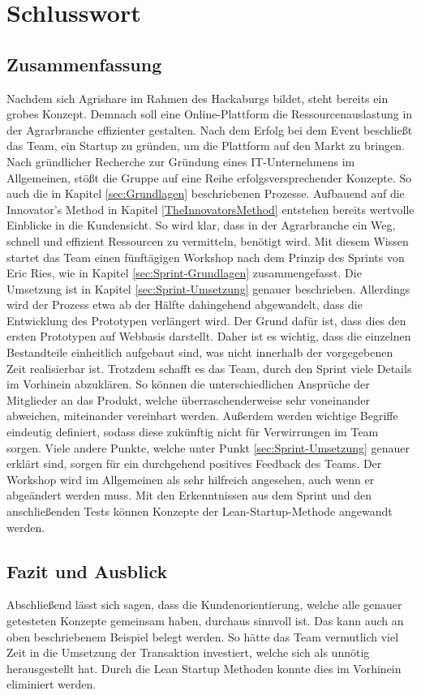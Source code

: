 \chapter{Schlusswort}
\section{Zusammenfassung}
Nachdem sich Agrishare im Rahmen des Hackaburgs bildet, steht bereits ein grobes Konzept. Demnach soll eine Online-Plattform die Ressourcenauslastung in der Agrarbranche effizienter gestalten. Nach dem Erfolg bei dem Event beschließt das Team, ein Startup zu gründen, um die Plattform auf den Markt zu bringen. Nach gründlicher Recherche zur Gründung eines IT-Unternehmens im Allgemeinen, stößt die Gruppe auf eine Reihe erfolgsversprechender Konzepte. So auch die in Kapitel \ref{sec:Grundlagen} beschriebenen Prozesse. Aufbauend auf die Innovator's Method in Kapitel \ref{TheInnovatorsMethod} entstehen bereits wertvolle Einblicke in die Kundensicht. So wird klar, dass in der Agrarbranche ein Weg, schnell und effizient Ressourcen zu vermitteln, benötigt wird. Mit diesem Wissen startet das Team einen fünftägigen Workshop nach dem Prinzip des Sprints von Eric Ries, wie in Kapitel \ref{sec:Sprint-Grundlagen} zusammengefasst. Die Umsetzung ist in Kapitel \ref{sec:Sprint-Umsetzung} genauer beschrieben. Allerdings wird der Prozess etwa ab der Hälfte dahingehend abgewandelt, dass die Entwicklung des Prototypen verlängert wird. Der Grund dafür ist, dass dies den ersten Prototypen auf Webbasis darstellt. Daher ist es wichtig, dass die einzelnen Bestandteile einheitlich aufgebaut sind, was nicht innerhalb der vorgegebenen Zeit realisierbar ist. Trotzdem schafft es das Team, durch den Sprint viele Details im Vorhinein abzuklären. So können die unterschiedlichen Ansprüche der Mitglieder an das Produkt, welche überraschenderweise sehr voneinander abweichen, miteinander vereinbart werden. Außerdem werden wichtige Begriffe eindeutig definiert, sodass diese zukünftig nicht für Verwirrungen im Team sorgen. Viele andere Punkte, welche unter Punkt \ref{sec:Sprint-Umsetzung} genauer erklärt sind, sorgen für ein durchgehend positives Feedback des Teams. Der Workshop wird im Allgemeinen als sehr hilfreich angesehen, auch wenn er abgeändert werden muss. Mit den Erkenntnissen aus dem Sprint und den anschließenden Tests können Konzepte der Lean-Startup-Methode angewandt werden.

\section{Fazit und Ausblick}
Abschließend lässt sich sagen, dass die Kundenorientierung, welche alle genauer getesteten Konzepte gemeinsam haben, durchaus sinnvoll ist. Das kann auch an oben beschriebenem Beispiel belegt werden. So hätte das Team vermutlich viel Zeit in die Umsetzung der Transaktion investiert, welche sich als unnötig herausgestellt hat. Durch die Lean Startup Methoden konnte dies im Vorhinein eliminiert werden.